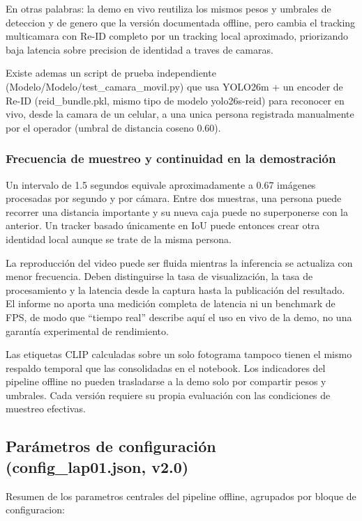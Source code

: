 \documentclass[12pt,letterpaper]{article}
\begin{document}
En otras palabras: la demo en vivo reutiliza los mismos pesos y umbrales de deteccion y de genero que la versión documentada offline, pero cambia el tracking multicamara con Re-ID completo por un tracking local aproximado, priorizando baja latencia sobre precision de identidad a traves de camaras.


Existe ademas un script de prueba independiente (Modelo/Modelo/test\_camara\_movil.py) que usa YOLO26m + un encoder de Re-ID (reid\_bundle.pkl, mismo tipo de modelo yolo26s-reid) para reconocer en vivo, desde la camara de un celular, a una unica persona registrada manualmente por el operador (umbral de distancia coseno 0.60).


\subsubsection{Frecuencia de muestreo y continuidad en la demostración}
Un intervalo de 1.5 segundos equivale aproximadamente a 0.67 imágenes procesadas por segundo y por cámara. Entre dos muestras, una persona puede recorrer una distancia importante y su nueva caja puede no superponerse con la anterior. Un tracker basado únicamente en IoU puede entonces crear otra identidad local aunque se trate de la misma persona.

La reproducción del video puede ser fluida mientras la inferencia se actualiza con menor frecuencia. Deben distinguirse la tasa de visualización, la tasa de procesamiento y la latencia desde la captura hasta la publicación del resultado. El informe no aporta una medición completa de latencia ni un benchmark de FPS, de modo que ``tiempo real'' describe aquí el uso en vivo de la demo, no una garantía experimental de rendimiento.

Las etiquetas CLIP calculadas sobre un solo fotograma tampoco tienen el mismo respaldo temporal que las consolidadas en el notebook. Los indicadores del pipeline offline no pueden trasladarse a la demo solo por compartir pesos y umbrales. Cada versión requiere su propia evaluación con las condiciones de muestreo efectivas.


\subsection{Parámetros de configuración (config\_lap01.json, v2.0)}

Resumen de los parametros centrales del pipeline offline, agrupados por bloque de configuracion:
\end{document}
